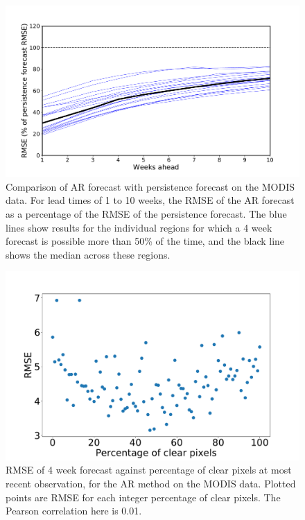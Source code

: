 \documentclass[review]{elsarticle}
\begin{document}
\begin{figure}[H]
	\centering
	\includegraphics[trim = 20mm 0mm 0mm 0mm,width=12.5cm]{figures/persistence.pdf} 
	\caption{Comparison of AR forecast with persistence forecast on the MODIS data. For lead times of 1 to 10 weeks, the RMSE of the AR forecast as a percentage of the RMSE of the persistence forecast. The blue lines show results for the individual regions for which a 4 week forecast is possible more than 50\% of the time, and the black line shows the median across these regions.} \label{fig:persistence}
\end{figure}

\begin{figure}[H]
	\centering
	\includegraphics[trim = 30mm 35mm 0mm 10mm,width=10 cm]{figures/ngaps.pdf} 
	\vspace{0.8cm}
	\caption{RMSE of 4 week forecast against percentage of clear pixels at most recent observation, for the AR method on the MODIS data. Plotted points are RMSE for each integer percentage of clear pixels. The Pearson correlation here is 0.01.} \label{fig:percentclear}
\end{figure}

\newpage
\end{document}
